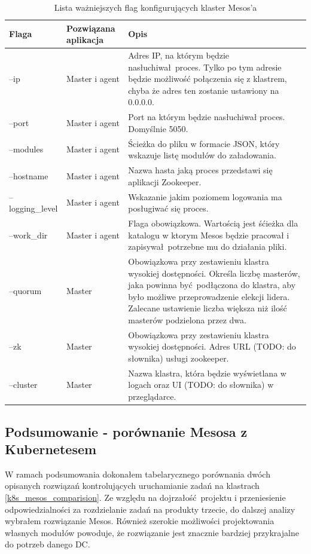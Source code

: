\documentclass[10pt,a4paper,titlepage,twoside]{report}
\begin{document}
\begin{table}[!htbp]
\caption{Lista ważniejszych flag konfigurujących klaster Mesos'a}
\label{mesos_flags}
\centering
\begin{tabular}{|p{3cm}|p{3cm}|p{8cm}|}
  \hline
  \textbf{Flaga} & \textbf{Pozwiązana aplikacja} & \textbf{Opis}\\
  \hline
  --ip & Master i agent & Adres IP, na którym będzie nasłuchiwał proces. Tylko po tym adresie będzie możliwość połączenia się z klastrem, chyba że adres ten zostanie ustawiony na 0.0.0.0. \\
  \hline
  --port & Master i agent & Port na którym będzie nasłuchiwał proces. Domyślnie 5050. \\
  \hline
  --modules & Master i agent & Ścieżka do pliku w formacie JSON, który wskazuje listę modułów do załadowania. \\
  \hline
  --hostname & Master i agent & Nazwa hasta jaką proces przedstawi się aplikacji Zookeeper. \\
  \hline
  --logging\_level & Master i agent & Wskazanie jakim poziomem logowania ma posługiwać się proces.  \\
  \hline
  --work\_dir & Master i agent & Flaga obowiązkowa. Wartością jest śćieżka dla katalogu w ktorym Mesos będzie pracował i zapisywał potrzebne mu do działania pliki. \\
  \hline
  --quorum & Master & Obowiązkowa przy zestawieniu klastra wysokiej dostępności. Określa liczbę masterów, jaka powinna być podłączona do klastra, aby było możliwe przeprowadzenie elekcji lidera. Zalecane ustawienie liczba większa niż ilość masterów podzielona przez dwa. \\
  \hline
  --zk & Master & Obowiązkowa przy zestawieniu klastra wysokiej dostępności. Adres URL (TODO: do słownika) usługi zookeeper. \\
  \hline
  --cluster & Master & Nazwa klastra, która będzie wyświetlana w logach oraz UI (TODO: do słownika) w przeglądarce. \\
  \hline
\end{tabular}
\end{table}

\subsection{Podsumowanie - porównanie Mesosa z Kubernetesem}
W ramach podsumowania dokonałem tabelarycznego porównania dwóch opisanych rozwiązań kontrolujących uruchamianie zadań na klastrach \ref{k8s_mesos_comparision}. Ze względu na dojrzałość projektu i przeniesienie odpowiedzialności za rozdzielanie zadań na produkty trzecie, do dalszej analizy wybrałem rozwiązanie Mesos. Również szerokie możliwości projektowania własnych modułów powoduje, że rozwiązanie jest znacznie bardziej przykrajalne do potrzeb danego DC.
\end{document}
